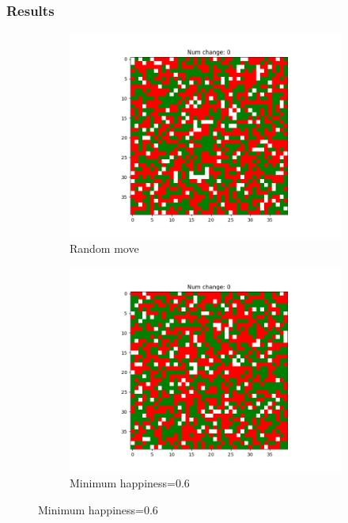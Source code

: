 \documentclass[11pt]{article}
\begin{document}
	\subsubsection{Results}
	\begin{figure}[h]
		\centering
		\begin{subfigure}{0.14\textwidth}
			\includegraphics[width=\linewidth]{initial_random.png}
			\caption{\centering Random move}
			\label{distance_initialrandom}
		\end{subfigure}\hfill
		\begin{subfigure}{0.14\textwidth}
			\includegraphics[width=\linewidth]{policy4_initial_min6.png}
			\caption{\centering Minimum happiness=0.6}
			\label{distance_initialmin6}

\end{subfigure}
\end{figure}
\end{document}
